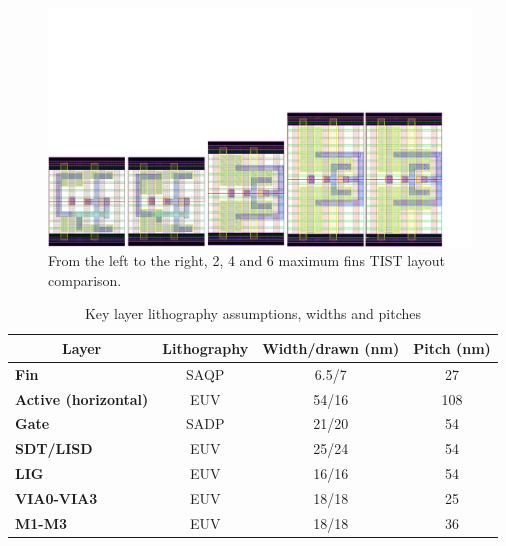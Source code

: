 \documentclass[pgmicro,diss,english]{iiufrgs}
\begin{document}
\begin{figure}[]
\centering
\includegraphics[width=1.5\textwidth, trim={0cm 0cm 2cm 8cm},clip, angle=90]{TISTComp.pdf}
\caption{From the left to the right, 2, 4 and 6 maximum fins TIST layout comparison.}
\label{fig:tistComp}
\end{figure}

\begin{table}[]
\centering
\caption{Key layer lithography assumptions, widths and pitches}
\label{layers}
\begin{tabular}{lccc}
\hline
\multicolumn{1}{c}{\textbf{Layer}} & \textbf{Lithography} & \textbf{Width/drawn (nm)} & \textbf{Pitch (nm)} \\ \hline
\textbf{Fin}                         & SAQP                 & 6.5/7                     & 27                  \\ \hline
\textbf{Active (horizontal)}         & EUV                  & 54/16                     & 108                 \\ \hline
\textbf{Gate}                        & SADP                 & 21/20                     & 54                  \\ \hline
\textbf{SDT/LISD}                    & EUV                  & 25/24                     & 54                  \\ \hline
\textbf{LIG}                         & EUV                  & 16/16                     & 54                  \\ \hline
\textbf{VIA0-VIA3}                   & EUV                  & 18/18                     & 25                  \\ \hline
\textbf{M1-M3}                       & EUV                  & 18/18                     & 36                  \\ \hline
\end{tabular}
\end{table}
\end{document}
